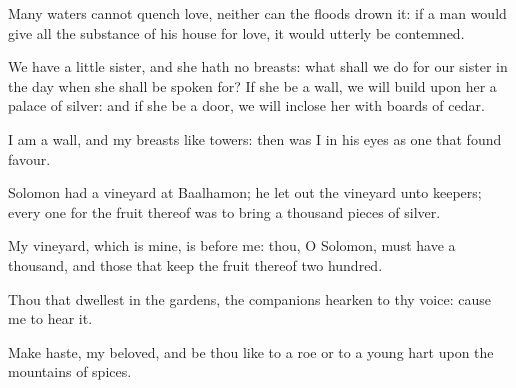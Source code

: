 \verse Many waters cannot quench love, neither can the floods drown it: if a man would give all the substance of his house for love, it would utterly be contemned.

\verse We have a little sister, and she hath no breasts: what shall we do for our sister in the day when she shall be spoken for?  \verse If she be a wall, we will build upon her a palace of silver: and if she be a door, we will inclose her with boards of cedar.

\verse I am a wall, and my breasts like towers: then was I in his eyes as one that found favour.

\verse Solomon had a vineyard at Baalhamon; he let out the vineyard unto keepers; every one for the fruit thereof was to bring a thousand pieces of silver.

\verse My vineyard, which is mine, is before me: thou, O Solomon, must have a thousand, and those that keep the fruit thereof two hundred.

\verse Thou that dwellest in the gardens, the companions hearken to thy voice: cause me to hear it.

\verse Make haste, my beloved, and be thou like to a roe or to a young hart upon the mountains of spices.

